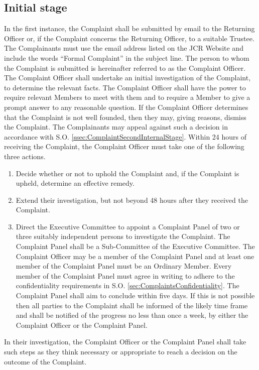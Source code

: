 \subsection{Initial stage}
\npara In the first instance, the Complaint shall be submitted by email to the Returning Officer or, if the Complaint concerns the Returning Officer, to a suitable Trustee.  The Complainants must use the email address listed on the JCR Website and include the words ``Formal Complaint'' in the subject line.  The person to whom the Complaint is submitted is hereinafter referred to as the Complaint Officer.
\npara The Complaint Officer shall undertake an initial investigation of the Complaint, to determine the relevant facts.  The Complaint Officer shall have the power to require relevant Members to meet with them and to require a Member to give a prompt answer to any reasonable question.
\npara If the Complaint Officer determines that the Complaint is not well founded, then they may, giving reasons, dismiss the Complaint.  The Complainants may appeal against such a decision in accordance with S.O. \ref{ssec:ComplaintSecondInternalStage}.
\npara \label{SO:ComplaintOfficerActions} Within 24 hours of receiving the Complaint, the Complaint Officer must take one of the following three actions.
\begin{enumerate}
\item Decide whether or not to uphold the Complaint and, if the Complaint is upheld, determine an effective remedy.
\item \label{SC:ComplaintInvestigationExtension} Extend their investigation, but not beyond 48 hours after they received the Complaint.
\item Direct the Executive Committee to appoint a Complaint Panel of two or three suitably independent persons to investigate the Complaint.  The Complaint Panel shall be a Sub-Committee of the Executive Committee.  The Complaint Officer may be a member of the Complaint Panel and at least one member of the Complaint Panel must be an Ordinary Member.  Every member of the Complaint Panel must agree in writing to adhere to the confidentiality requirements in S.O. \ref{sec:ComplaintsConfidentiality}.  The Complaint Panel shall aim to conclude within five days.  If this is not possible then all parties to the Complaint shall be informed of the likely time frame and shall be notified of the progress no less than once a week, by either the Complaint Officer or the Complaint Panel.
\end{enumerate}
\npara In their investigation, the Complaint Officer or the Complaint Panel shall take such steps as they think necessary or appropriate to reach a decision on the outcome of the Complaint.

